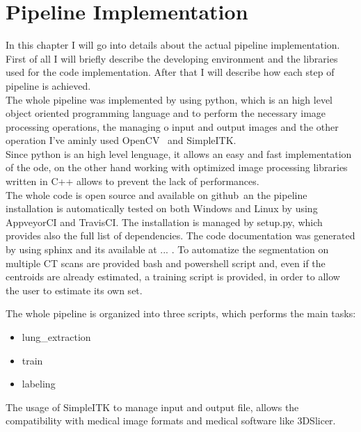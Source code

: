 
	
	\section{Pipeline Implementation}
	
	In this chapter I will go into details about the actual pipeline implementation. First of all I will briefly describe the developing environment and the libraries used for the code implementation. After that I will describe how each step of pipeline is achieved.\\
	The whole pipeline was implemented by using python, which is an high level object oriented programming language and to perform the necessary image processing operations, the managing o input and output images and the other operation I've aminly used OpenCV~\cite{OpenCV} and SimpleITK.\\
	Since python is an high level lenguage, it allows an easy and fast implementation of the ode, on the other hand working with optimized image processing libraries written in C++ allows to prevent the lack of performances.\\	
	The whole code is open source and available on github~\cite{REP:CTLungSeg}an the pipeline installation is automatically tested on both Windows and Linux by using AppveyorCI and TravisCI.  The installation is managed by setup.py, which provides also the full list of dependencies. The code documentation was generated by using sphinx and its available at ... . To automatize the segmentation on multiple CT scans are provided bash and powershell script and,  even if the centroids are already estimated, a training script is provided, in order to allow the user to estimate its own set.
	
	The whole pipeline is organized into three scripts, which performs the main tasks: 
	\begin{itemize}
		\item lung\_extraction
		\item train
		\item labeling
	\end{itemize}

	The usage of SimpleITK to manage input and output file, allows the compatibility with medical image formats and medical software like 3DSlicer.

